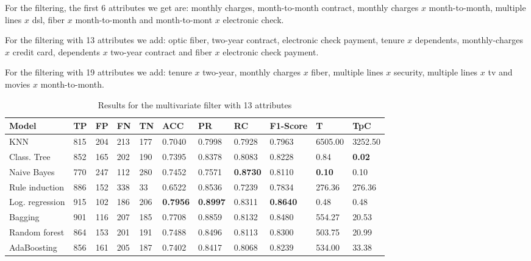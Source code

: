 \documentclass[a4paper,11pt]{article}
\begin{document}
For the filtering, the first 6 attributes we get are: monthly charges, month-to-month contract, monthly charges $x$ month-to-month, multiple lines $x$ dsl, fiber $x$ month-to-month and month-to-mont $x$ electronic check.

For the filtering with 13 attributes we add: optic fiber, two-year contract, electronic check payment, tenure $x$ dependents, monthly-charges $x$ credit card, dependents $x$ two-year contract and fiber $x$ electronic check payment.

For the filtering with 19 attributes we add: tenure $x$ two-year, monthly charges $x$ fiber, multiple lines $x$ security, multiple lines $x$ tv and movies $x$ month-to-month.

\begin{table}
\centering
\begin{tabular}{|l|l|l|l|l|l|l|l|l|l|l|}
\hline

\textbf{Model} & \textbf{TP} & \textbf{FP} & \textbf{FN} & \textbf{TN} & \textbf{ACC} & \textbf{PR} & \textbf{RC} & \textbf{F1-Score} & \textbf{T} & \textbf{TpC} \\ \hline
KNN & 815 & 204 & 213 & 177 & 0.7040 & 0.7998 & 0.7928 & 0.7963 & 6505.00 & 3252.50 \\ \hline
Class. Tree & 852 & 165 & 202 & 190 & 0.7395 & 0.8378 & 0.8083 & 0.8228 & 0.84 & \textbf{0.02} \\ \hline
Naive Bayes & 770 & 247 & 112 & 280 & 0.7452 & 0.7571 & \textbf{0.8730} & 0.8110 & \textbf{0.10} & 0.10 \\ \hline
Rule induction & 886 & 152 & 338 & 33 & 0.6522 & 0.8536 & 0.7239 & 0.7834 & 276.36 & 276.36 \\ \hline
Log. regression & 915 & 102 & 186 & 206 & \textbf{0.7956} & \textbf{0.8997} & 0.8311 & \textbf{0.8640} & 0.48 & 0.48 \\ \hline
Bagging & 901 & 116 & 207 & 185 & 0.7708 & 0.8859 & 0.8132 & 0.8480 & 554.27 & 20.53 \\ \hline
Random forest & 864 & 153 & 201 & 191 & 0.7488 & 0.8496 & 0.8113 & 0.8300 & 503.75 & 20.99 \\ \hline
AdaBoosting & 856 & 161 & 205 & 187 & 0.7402 & 0.8417 & 0.8068 & 0.8239 & 534.00 & 33.38 \\ \hline

\end{tabular}
\caption{Results for the multivariate filter with 13 attributes}
\label{class:f50m}
\end{table}
\end{document}
